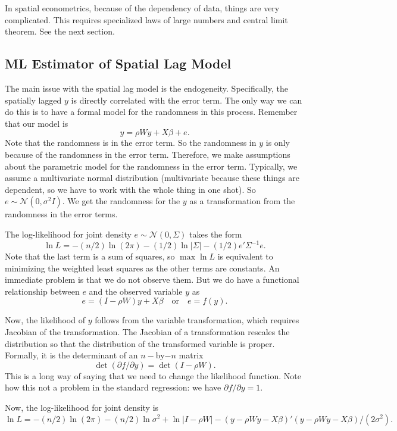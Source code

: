 \documentclass[11pt,a4paper]{amsart}
\theoremstyle{plain}
\theoremstyle{definition}
\begin{document}
In spatial econometrics, because of the dependency of data, things are very complicated. This requires specialized laws of large numbers and central limit theorem. See the next section.

\subsection{ML Estimator of Spatial Lag Model}\hfill\par 
The main issue with the spatial lag model is the endogeneity. Specifically, the spatially lagged $y$ is directly correlated with the error term. The only way we can do this is to have a formal model for the randomness in this process. Remember that our model is 
\[	y = \rho Wy + X\beta + e.	\]
Note that the randomness is in the error term. So the randomness in $y$ is only because of the randomness in the error term. Therefore, we make assumptions about the parametric model for the randomness in the error term. Typically, we assume a multivariate normal distribution (multivariate because these things are dependent, so we have to work with the whole thing in one shot). So $e \sim \mathscr{N}(0, \sigma^{2}I)$. We get the randomness for the $y$ as a transformation from the randomness in the error terms. 

The log-likelihood for joint density $e \sim \mathscr{N}(0, \Sigma)$ takes the form
\begin{equation}\label{log-likelihood}
	\ln L = -(n/2) \ln(2\pi) - (1/2) \ln |\Sigma| - (1/2) e'\Sigma^{-1}e.
\end{equation}
Note that the last term is a sum of squares, so $\max \ln L$ is equivalent to minimizing the weighted least squares as the other terms are constants. An immediate problem is that we do not observe them. But we do have a functional relationship between $e$ and the observed variable $y$ as 
\[	e = (I - \rho W)y + X \beta \quad \text{or} \quad e = f(y).	\]

Now, the likelihood of $y$ follows from the variable transformation, which requires Jacobian of the transformation.  The Jacobian of a transformation rescales the distribution so that the distribution of the transformed variable is proper. Formally, it is the determinant of an $n-$by$-n$ matrix
\[	\det (\partial f/\partial y) = \det (I - \rho W).	\]
This is a long way of saying that we need to change the likelihood function. Note how this not a problem in the standard regression: we have $\partial f/\partial y = 1$. 

Now, the  log-likelihood for joint density is 
\[	\ln L = -(n/2) \ln(2\pi) -(n/2)\ln \sigma^{2} + \ln |I-\rho W| - (y - \rho Wy - X \beta)'(y - \rho Wy - X \beta)/(2\sigma^{2}).	\]
\end{document}
